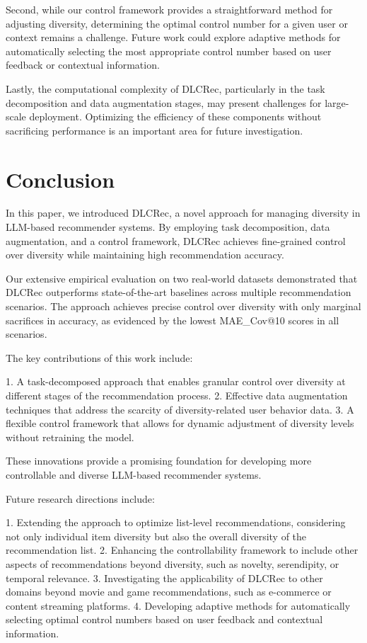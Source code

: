 \documentclass[12pt,letterpaper]{article}
\begin{document}
Second, while our control framework provides a straightforward method for adjusting diversity, determining the optimal control number for a given user or context remains a challenge. Future work could explore adaptive methods for automatically selecting the most appropriate control number based on user feedback or contextual information.

Lastly, the computational complexity of DLCRec, particularly in the task decomposition and data augmentation stages, may present challenges for large-scale deployment. Optimizing the efficiency of these components without sacrificing performance is an important area for future investigation.

\section{Conclusion}

In this paper, we introduced DLCRec, a novel approach for managing diversity in LLM-based recommender systems. By employing task decomposition, data augmentation, and a control framework, DLCRec achieves fine-grained control over diversity while maintaining high recommendation accuracy.

Our extensive empirical evaluation on two real-world datasets demonstrated that DLCRec outperforms state-of-the-art baselines across multiple recommendation scenarios. The approach achieves precise control over diversity with only marginal sacrifices in accuracy, as evidenced by the lowest MAE_Cov@10 scores in all scenarios.

The key contributions of this work include:

1. A task-decomposed approach that enables granular control over diversity at different stages of the recommendation process.
2. Effective data augmentation techniques that address the scarcity of diversity-related user behavior data.
3. A flexible control framework that allows for dynamic adjustment of diversity levels without retraining the model.

These innovations provide a promising foundation for developing more controllable and diverse LLM-based recommender systems.

Future research directions include:

1. Extending the approach to optimize list-level recommendations, considering not only individual item diversity but also the overall diversity of the recommendation list.
2. Enhancing the controllability framework to include other aspects of recommendations beyond diversity, such as novelty, serendipity, or temporal relevance.
3. Investigating the applicability of DLCRec to other domains beyond movie and game recommendations, such as e-commerce or content streaming platforms.
4. Developing adaptive methods for automatically selecting optimal control numbers based on user feedback and contextual information.
\end{document}
